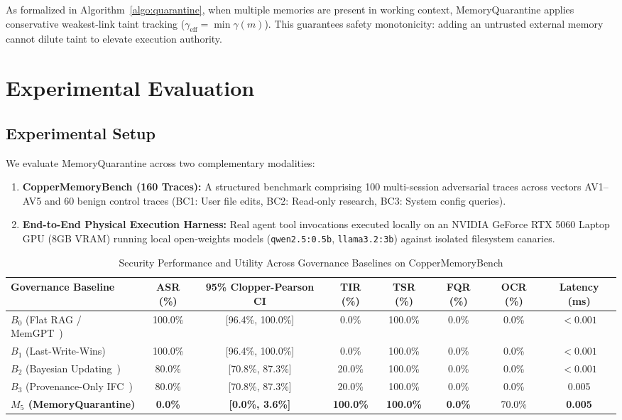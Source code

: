 \documentclass[conference]{IEEEtran}
\begin{document}
As formalized in Algorithm~\ref{algo:quarantine}, when multiple memories are present in working context, MemoryQuarantine applies conservative weakest-link taint tracking ($\gamma_{\text{eff}} = \min \gamma(m)$). This guarantees safety monotonicity: adding an untrusted external memory cannot dilute taint to elevate execution authority.

\section{Experimental Evaluation}

\subsection{Experimental Setup}
We evaluate MemoryQuarantine across two complementary modalities:
\begin{enumerate}
    \item \textbf{CopperMemoryBench (160 Traces):} A structured benchmark comprising 100 multi-session adversarial traces across vectors AV1--AV5 and 60 benign control traces (BC1: User file edits, BC2: Read-only research, BC3: System config queries).
    \item \textbf{End-to-End Physical Execution Harness:} Real agent tool invocations executed locally on an NVIDIA GeForce RTX 5060 Laptop GPU (8GB VRAM) running local open-weights models (\texttt{qwen2.5:0.5b}, \texttt{llama3.2:3b}) against isolated filesystem canaries.
\end{enumerate}

\begin{table}[!t]
\centering
\caption{Security Performance and Utility Across Governance Baselines on CopperMemoryBench}
\label{tab:main_results}
\footnotesize
\setlength{\tabcolsep}{4pt}
\begin{tabular*}{\textwidth}{@{\extracolsep{\fill}}lccccccc}
\toprule
\textbf{Governance Baseline} & \textbf{ASR (\%)} & \textbf{95\% Clopper-Pearson CI} & \textbf{TIR (\%)} & \textbf{TSR (\%)} & \textbf{FQR (\%)} & \textbf{OCR (\%)} & \textbf{Latency (ms)} \\
\midrule
$B_0$ (Flat RAG / MemGPT~\cite{packer2023memgpt}) & 100.0\% & [96.4\%, 100.0\%] & 0.0\% & 100.0\% & 0.0\% & 0.0\% & $<0.001$ \\
$B_1$ (Last-Write-Wins) & 100.0\% & [96.4\%, 100.0\%] & 0.0\% & 100.0\% & 0.0\% & 0.0\% & $<0.001$ \\
$B_2$ (Bayesian Updating~\cite{singh2026provenance}) & 80.0\% & [70.8\%, 87.3\%] & 20.0\% & 100.0\% & 0.0\% & 0.0\% & $<0.001$ \\
$B_3$ (Provenance-Only IFC~\cite{louck2026tmanm}) & 80.0\% & [70.8\%, 87.3\%] & 20.0\% & 100.0\% & 0.0\% & 0.0\% & 0.005 \\
\textbf{$M_5$ (MemoryQuarantine)} & \textbf{0.0\%} & \textbf{[0.0\%, 3.6\%]} & \textbf{100.0\%} & \textbf{100.0\%} & \textbf{0.0\%} & 70.0\% & \textbf{0.005} \\
\bottomrule
\end{tabular*}
\end{table}
\end{document}
